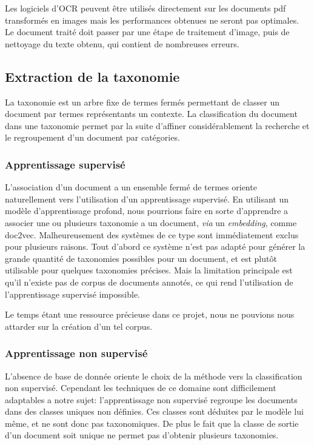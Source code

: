 Les logiciels d'OCR peuvent être utilisés directement sur les documents pdf transformés en images mais les performances obtenues ne seront pas optimales.
Le document traité doit passer par une étape de traitement d'image, puis de nettoyage du texte obtenu, qui contient de nombreuses erreurs.

\subsection{Extraction de la taxonomie}
La taxonomie est un arbre fixe de termes fermés permettant de classer un document par termes représentants un contexte.
La classification du document dans une taxonomie permet par la suite d'affiner considérablement la recherche et le regroupement d'un document par catégories.

\subsubsection{Apprentissage supervisé}
L'association d'un document a un ensemble fermé de termes oriente naturellement vers l'utilisation d'un apprentissage supervisé.
En utilisant un modèle d'apprentissage profond, nous pourrions faire en sorte d'apprendre a associer une ou plusieurs taxonomie a un document, \textit{via} un \textit{embedding}, comme doc2vec\cite{doc2vec}.
Malheureusement des systèmes de ce type sont immédiatement exclus pour plusieurs raisons.
Tout d'abord ce système n'est pas adapté pour générer la grande quantité de taxonomies possibles pour un document, et est plutôt utilisable pour quelques taxonomies précises.
Mais la limitation principale est qu'il n'existe pas de corpus de documents annotés, ce qui rend l'utilisation de l'apprentissage supervisé impossible.

Le temps étant une ressource précieuse dans ce projet, nous ne pouvions nous attarder sur la création d'un tel corpus.

\subsubsection{Apprentissage non supervisé}
L'absence de base de donnée oriente le choix de la méthode vers la classification non supervisé.
Cependant les techniques de ce domaine sont difficilement adaptables a notre sujet: l'apprentissage non supervisé regroupe les documents dans des classes uniques non définies.
Ces classes sont déduites par le modèle lui même, et ne sont donc pas taxonomiques.
De plus le fait que la classe de sortie d'un document soit unique ne permet pas d'obtenir plusieurs taxonomies.

